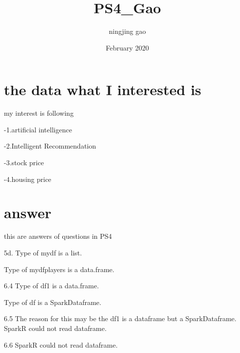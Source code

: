 \documentclass{article}
\title{PS4_Gao}
\author{ningjing gao}
\date{February 2020}
\begin{document}
\section{the data what I interested is}

my interest is following 


-1.artificial intelligence   

-2.Intelligent Recommendation

-3.stock price

-4.housing price



\section{answer}

this are answers of questions in PS4


5d. Type of mydf is a list. 

Type of mydfplayers is a data.frame. 


6.4 Type of df1 is a data.frame.

Type of df is a SparkDataframe. 
    

6.5 The reason for this may be the df1 is a dataframe but a SparkDataframe. SparkR could not read dataframe. 
 

6.6  SparkR could not read dataframe. 
\end{document}
